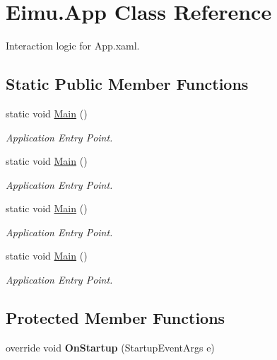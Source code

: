 \hypertarget{class_eimu_1_1_app}{
\section{Eimu.App Class Reference}
\label{class_eimu_1_1_app}
}


Interaction logic for App.xaml.  


\subsection*{Static Public Member Functions}
\begin{DoxyCompactItemize}
\item 
static void \hyperlink{class_eimu_1_1_app_a08cd0dccc39b1de41541037f6e885c2e}{Main} ()
\begin{DoxyCompactList}\small\item\em Application Entry Point. \item\end{DoxyCompactList}\item 
static void \hyperlink{class_eimu_1_1_app_a08cd0dccc39b1de41541037f6e885c2e}{Main} ()
\begin{DoxyCompactList}\small\item\em Application Entry Point. \item\end{DoxyCompactList}\item 
static void \hyperlink{class_eimu_1_1_app_a08cd0dccc39b1de41541037f6e885c2e}{Main} ()
\begin{DoxyCompactList}\small\item\em Application Entry Point. \item\end{DoxyCompactList}\item 
static void \hyperlink{class_eimu_1_1_app_a08cd0dccc39b1de41541037f6e885c2e}{Main} ()
\begin{DoxyCompactList}\small\item\em Application Entry Point. \item\end{DoxyCompactList}\end{DoxyCompactItemize}
\subsection*{Protected Member Functions}
\begin{DoxyCompactItemize}
\item 
\hypertarget{class_eimu_1_1_app_a3c6ad2d4e5fd7a998a8a6bd6b9769854}{
override void {\bfseries OnStartup} (StartupEventArgs e)}
\label{class_eimu_1_1_app_a3c6ad2d4e5fd7a998a8a6bd6b9769854}

\end{DoxyCompactItemize}


